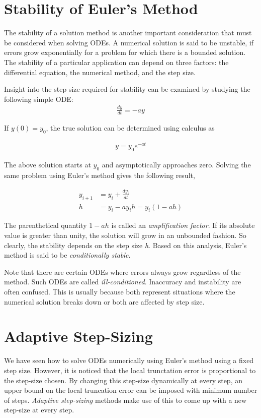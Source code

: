 \documentclass[book.tex]{subfiles}
\begin{document}
\section{Stability of Euler's Method}

The stability of a solution method is another important consideration that must be considered when solving ODEs. A numerical solution is said to be unstable, if errors grow exponentially for a problem for which there is a bounded solution. The stability of a particular application can depend on three factors: the differential equation, the numerical method, and the step size.

Insight into the step size required for stability can be examined by studying the following simple ODE:
\begin{align}
\frac{dy}{dt} = -ay
\end{align}

If $y(0)=y_0$, the true solution can be determined using calculus as
	
\begin{align}
y = y_0e^{-at}
\end{align}

The above solution starts at $y_0$ and asymptotically approaches zero. Solving the same problem using Euler's method gives the following result,
	
\begin{align}
y_{i+1} &= y_i + \frac{dy_i}{dt}\\
h &= y_i - ay_ih = y_i(1-ah)
\end{align}

The parenthetical quantity $1-ah$ is called an \textit{amplification factor}. If its absolute value is greater than unity, the solution will grow in an unbounded fashion. So clearly, the stability depends on the step size \textit{h}. Based on this analysis,
Euler’s method is said to be \textit{conditionally stable}.

Note that there are certain ODEs where errors always grow regardless of the method.
Such ODEs are called \textit{ill-conditioned}. Inaccuracy and instability are often confused. This is usually because both represent situations where the numerical solution breaks down or both are affected by step size.
\section{Adaptive Step-Sizing}

We have seen how to solve ODEs numerically using Euler's method using
a fixed step size. However, it is noticed that the local trunctation error is proportional to the step-size chosen. By changing this step-size dynamically at every step, an upper bound on the local truncation error can be imposed with minimum number of steps. \textit{Adaptive step-sizing} methods make use of this to come up with a new step-size at every step.
\end{document}
